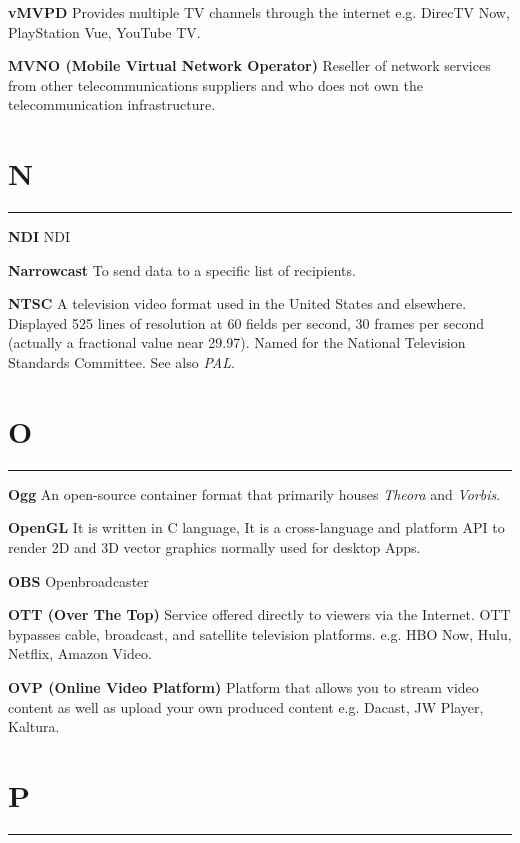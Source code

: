 \smallskip
\textbf{vMVPD}
Provides multiple TV channels through the internet e.g. DirecTV Now, PlayStation Vue, YouTube TV.

\smallskip
\textbf{MVNO (Mobile Virtual Network Operator)}
Reseller of network services from other telecommunications suppliers and who does not own the telecommunication infrastructure.


\section{N}
\hrule

\smallskip
\textbf{NDI}
NDI

\smallskip
\textbf{Narrowcast}
To send data to a specific list of recipients.

\smallskip
\textbf{NTSC}
A television video format used in the United States and elsewhere. Displayed 525 lines of resolution at 60 fields per second, 30 frames per second (actually a fractional value near 29.97). Named for the National Television Standards Committee. See also \textit{PAL}.


\section{O}
\hrule

\smallskip
\textbf{Ogg}
An open-source container format that primarily houses \textit{Theora} and \textit{Vorbis}.

\smallskip
\textbf{OpenGL}
It is written in C language, It is a cross-language and platform API to render 2D and 3D vector graphics normally used for desktop Apps.

\smallskip
\textbf{OBS}
Openbroadcaster

\smallskip
\textbf{OTT (Over The Top)}
Service offered directly to viewers via the Internet. OTT bypasses cable, broadcast, and satellite television platforms. e.g. HBO Now, Hulu, Netflix, Amazon Video.

\smallskip
\textbf{OVP (Online Video Platform)}
Platform that allows you to stream video content as well as upload your own produced content e.g. Dacast, JW Player, Kaltura.


\section{P}
\hrule

